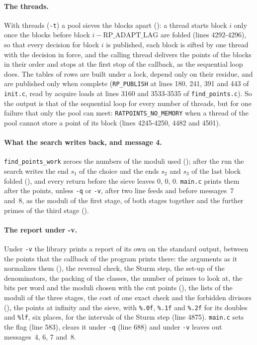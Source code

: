 \paragraph{The threads.} With threads (\verb|-t|) a pool sieves the blocks apart
(): a thread starts block $i$ only once the blocks before block
$i - \mathrm{RP\_ADAPT\_LAG}$ are folded (lines 4292-4296), so that every decision for block $i$ is
published, each block is sifted by one thread with the decision in force, and the calling thread
delivers the points of the blocks in their order and stops at the first stop of the callback, as the
sequential loop does. The tables of rows are built under a lock, depend only on their residue, and
are published only when complete (\verb|RP_PUBLISH| at lines 180, 241, 391 and 443 of \verb|init.c|,
read by acquire loads at lines 3160 and 3533-3535 of \verb|find_points.c|). So the output is that of
the sequential loop for every number of threads, but for one failure that only the pool can meet:
\verb|RATPOINTS_NO_MEMORY| when a thread of the pool cannot store a point of its block (lines
4245-4250, 4482 and 4501).

\paragraph{What the search writes back, and message 4.} \verb|find_points_work| zeroes the numbers
of the moduli used (); after the run the search writes the end
$s_1$ of the choice and the ends $s_2$ and $s_3$ of the last block folded
(), and every return before the sieve leaves $0$, $0$, $0$.
\verb|main.c| prints them after the points, unless \verb|-q| or \verb|-v|, after two line feeds and
before messages~7 and~8, as the moduli of the first stage, of both stages together and the further
primes of the third stage ().

\paragraph{The report under -v.} Under \verb|-v| the library prints a report of its own on the
standard output, between the points that the callback of the program prints there: the arguments as
it normalizes them (), the reversal check, the Sturm step, the
set-up of the denominators, the packing of the classes, the number of primes to look at, the bits
per word and the moduli chosen with the cut points (), the lists
of the moduli of the three stages, the cost of one exact check and the forbidden divisors
(), the points at infinity and the sieve, with \verb|%.0f|,
\verb|%.1f| and \verb|%.2f| for its doubles and \verb|%lf|, six places, for the intervals of the
Sturm step (line 4875). \verb|main.c| sets the flag (line 583), clears it under \verb|-q| (line 688)
and under \verb|-v| leaves out messages~4, 6, 7 and~8.

